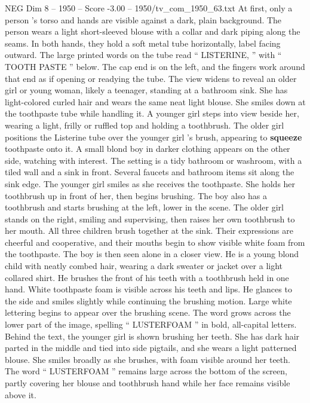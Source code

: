 \begin{textsample}{NEG Dim 8 – 1950 – Score -3.00 – 1950/tv\_com\_1950\_63.txt}  \label{ex:f8_neg_024}
At first, only a person ’s torso and hands are visible against a dark, plain background.
The person wears a light short-sleeved blouse with a collar and dark piping along the seams.
In both hands, they hold a soft metal tube horizontally, label facing outward.
The large printed words on the tube read “ LISTERINE, ” with “ TOOTH PASTE ” below.
The cap end is on the left, and the fingers work around that end as if opening or readying the tube.
The view widens to reveal an older girl or young woman, likely a teenager, standing at a bathroom sink.
She has light-colored curled hair and wears the same neat light blouse.
She smiles down at the toothpaste tube while handling it.
A younger girl steps into view beside her, wearing a light, frilly or ruffled top and holding a toothbrush.
The older girl positions the Listerine tube over the younger girl ’s brush, appearing to \textbf{squeeze} toothpaste onto it.
A small blond boy in darker clothing appears on the other side, watching with interest.
The setting is a tidy bathroom or washroom, with a tiled wall and a sink in front.
Several faucets and bathroom items sit along the sink edge.
The younger girl smiles as she receives the toothpaste.
She holds her toothbrush up in front of her, then begins brushing.
The boy also has a toothbrush and starts brushing at the left, lower in the scene.
The older girl stands on the right, smiling and supervising, then raises her own toothbrush to her mouth.
All three children brush together at the sink.
Their expressions are cheerful and cooperative, and their mouths begin to show visible white foam from the toothpaste.
The boy is then seen alone in a closer view.
He is a young blond child with neatly combed hair, wearing a dark sweater or jacket over a light collared shirt.
He brushes the front of his teeth with a toothbrush held in one hand.
White toothpaste foam is visible across his teeth and lips.
He glances to the side and smiles slightly while continuing the brushing motion.
Large white lettering begins to appear over the brushing scene.
The word grows across the lower part of the image, spelling “ LUSTERFOAM ” in bold, all-capital letters.
Behind the text, the younger girl is shown brushing her teeth.
She has dark hair parted in the middle and tied into side pigtails, and she wears a light patterned blouse.
She smiles broadly as she brushes, with foam visible around her teeth.
The word “ LUSTERFOAM ” remains large across the bottom of the screen, partly covering her blouse and toothbrush hand while her face remains visible above it.

\end{textsample}
